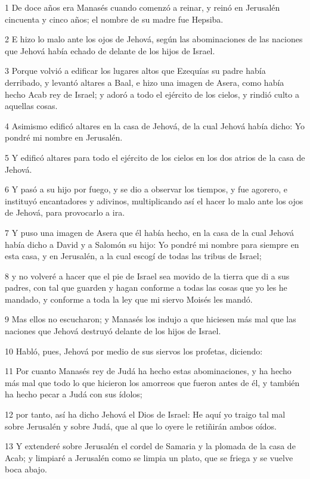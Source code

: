 \par 1 De doce años era Manasés cuando comenzó a reinar, y reinó en Jerusalén cincuenta y cinco años; el nombre de su madre fue Hepsiba.
\par 2 E hizo lo malo ante los ojos de Jehová, según las abominaciones de las naciones que Jehová había echado de delante de los hijos de Israel.
\par 3 Porque volvió a edificar los lugares altos que Ezequías su padre había derribado, y levantó altares a Baal, e hizo una imagen de Asera, como había hecho Acab rey de Israel; y adoró a todo el ejército de los cielos, y rindió culto a aquellas cosas.
\par 4 Asimismo edificó altares en la casa de Jehová, de la cual Jehová había dicho: Yo pondré mi nombre en Jerusalén. 
\par 5 Y edificó altares para todo el ejército de los cielos en los dos atrios de la casa de Jehová.
\par 6 Y pasó a su hijo por fuego, y se dio a observar los tiempos, y fue agorero, e instituyó encantadores y adivinos, multiplicando así el hacer lo malo ante los ojos de Jehová, para provocarlo a ira.
\par 7 Y puso una imagen de Asera que él había hecho, en la casa de la cual Jehová había dicho a David y a Salomón su hijo: Yo pondré mi nombre para siempre en esta casa, y en Jerusalén, a la cual escogí de todas las tribus de Israel;
\par 8 y no volveré a hacer que el pie de Israel sea movido de la tierra que di a sus padres, con tal que guarden y hagan conforme a todas las cosas que yo les he mandado, y conforme a toda la ley que mi siervo Moisés les mandó. 
\par 9 Mas ellos no escucharon; y Manasés los indujo a que hiciesen más mal que las naciones que Jehová destruyó delante de los hijos de Israel.
\par 10 Habló, pues, Jehová por medio de sus siervos los profetas, diciendo:
\par 11 Por cuanto Manasés rey de Judá ha hecho estas abominaciones, y ha hecho más mal que todo lo que hicieron los amorreos que fueron antes de él, y también ha hecho pecar a Judá con sus ídolos;
\par 12 por tanto, así ha dicho Jehová el Dios de Israel: He aquí yo traigo tal mal sobre Jerusalén y sobre Judá, que al que lo oyere le retiñirán ambos oídos.
\par 13 Y extenderé sobre Jerusalén el cordel de Samaria y la plomada de la casa de Acab; y limpiaré a Jerusalén como se limpia un plato, que se friega y se vuelve boca abajo.
